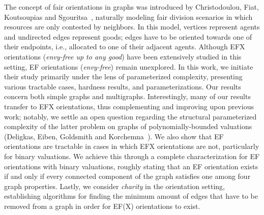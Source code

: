 The concept of fair orientations in graphs was introduced by Christodoulou, Fiat, Koutsoupias and Sgouritsa~\cite{EFXgraphs}, naturally modeling fair division scenarios in which resources are only contested by neighbors. In this model, vertices represent agents and undirected edges represent goods; edges have to be oriented towards one of their endpoints, i.e., allocated to one of their adjacent agents. Although EFX orientations (\emph{envy-free up to any good}) have been extensively studied in this setting, EF orientations (\emph{envy-free}) remain unexplored. In this work, we initiate their study primarily under the lens of parameterized complexity, presenting various tractable cases, hardness results, and parameterizations. Our results concern both simple graphs and multigraphs. Interestingly, many of our results transfer to EFX orientations, thus complementing and improving upon previous work; notably, we settle an open question regarding the structural parameterized complexity of the latter problem on graphs of polynomially-bounded valuations (Deligkas, Eiben, Goldsmith and Korchemna~\cite{ijcai/DeligkasEGK25}).
We also show that EF orientations are tractable in cases in which EFX orientations are not, particularly for binary valuations. We achieve this through a complete characterization for EF orientations with binary valuations, roughly stating that an EF orientation exists if and only if every connected component of the graph satisfies one among four graph properties. Lastly, we consider \emph{charity} in the orientation setting, establishing algorithms for finding the minimum amount of edges that have to be removed from a graph in order for EF(X) orientations to exist.


